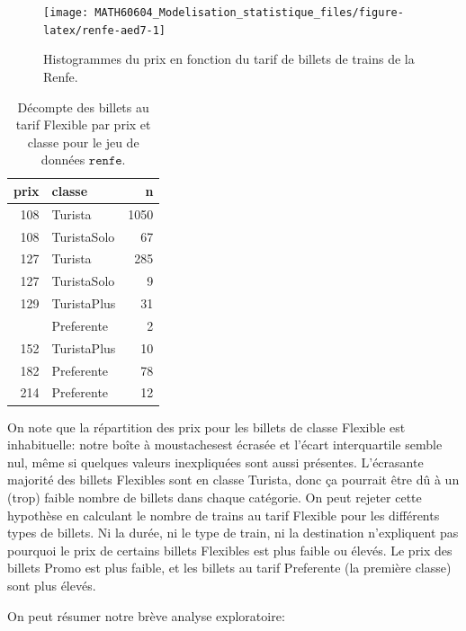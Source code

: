 \documentclass[
  11pt,
  letterpaper,
]{article}
\theoremstyle{definition}
\theoremstyle{definition}
\theoremstyle{definition}
\theoremstyle{definition}
\theoremstyle{remark}
\begin{document}
\begin{figure}

{\centering \texttt{[image: MATH60604\_Modelisation\_statistique\_files/figure-latex/renfe-aed7-1]} 

}

\caption{Histogrammes du prix en fonction du tarif de billets de trains de la Renfe.}\label{fig:renfe-aed7}
\end{figure}
\begin{table}

\caption{\label{tab:renfe-aed7}Décompte des billets au tarif Flexible par prix et classe pour le jeu de données $\texttt{renfe}$.}
\centering
\begin{tabular}[t]{rlr}
\toprule
prix & classe & n\\
\midrule
108 & Turista & 1050\\
108 & TuristaSolo & 67\\
127 & Turista & 285\\
127 & TuristaSolo & 9\\
129 & TuristaPlus & 31\\
\addlinespace
140 & Preferente & 2\\
152 & TuristaPlus & 10\\
182 & Preferente & 78\\
214 & Preferente & 12\\
\bottomrule
\end{tabular}
\end{table}

On note que la répartition des prix pour les billets de classe Flexible est inhabituelle: notre boîte à moustachesest écrasée et l'écart interquartile semble nul, même si quelques valeurs inexpliquées sont aussi présentes. L'écrasante majorité des billets Flexibles sont en classe Turista, donc ça pourrait être dû à un (trop) faible nombre de billets dans chaque catégorie. On peut rejeter cette hypothèse en calculant le nombre de trains au tarif Flexible pour les différents types de billets. Ni la durée, ni le type de train, ni la destination n'expliquent pas pourquoi le prix de certains billets Flexibles est plus faible ou élevés. Le prix des billets Promo est plus faible, et les billets au tarif Preferente (la première classe) sont plus élevés.

On peut résumer notre brève analyse exploratoire:
\end{document}
